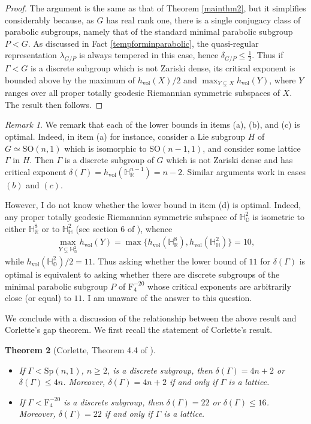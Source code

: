 \documentclass[psamsfonts]{amsart}
\newtheorem{thm}{Theorem}[section]
\theoremstyle{definition}
\theoremstyle{remark}
\newtheorem{rem}[thm]{Remark}
\numberwithin{equation}{section}
\begin{document}
\begin{proof}
The argument is the same as that of Theorem \ref{mainthm2}, but it simplifies considerably because, as $G$ has real rank one, there is a single conjugacy class of parabolic subgroups, namely that of the standard minimal parabolic subgroup $P < G$. As discussed in Fact \ref{tempforminparabolic}, the quasi-regular representation $\lambda_{G/P}$ is always tempered in this case, hence $\delta_{G/P} \leq \frac{1}{2}$. Thus if $\Gamma < G$ is a discrete subgroup which is not Zariski dense, its critical exponent is bounded above by the maximum of $h_{\mathrm{vol}}(X)/2$ and $\max_{Y \subsetneq X} h_{\mathrm{vol}}(Y)$, where $Y$ ranges over all proper totally geodesic Riemannian symmetric subspaces of $X$. The result then follows.
\end{proof}
\begin{rem}
We remark that each of the lower bounds in items (a), (b), and (c) is optimal. Indeed, in item (a) for instance, consider a Lie subgroup $H$ of $G \simeq \mathrm{SO}(n,1)$ which is isomorphic to SO$(n-1,1)$, and consider some lattice $\Gamma$ in $H$. Then $\Gamma$ is a discrete subgroup of $G$ which is not Zariski dense and has critical exponent $\delta(\Gamma) = h_{\mathrm{vol}}(\mathbb{H}_{\mathbb{R}}^{n-1}) = n-2$. Similar arguments work in cases $(b)$ and $(c)$.
\par 
However, I do not know whether the lower bound in item (d) is optimal. Indeed, any proper totally geodesic Riemannian symmetric subspace of $\mathbb{H}_{\mathbb{O}}^2$ is isometric to either $\mathbb{H}_{\mathbb{R}}^{8}$ or to $\mathbb{H}_{\mathbb{H}}^{2}$ (see section 6 of \cite{Cor}), whence 
\begin{align*}
\max_{Y \subsetneq \mathbb{H}_{\mathbb{O}}^{2}} h_{\mathrm{vol}}(Y) = \max \Big \{h_{\mathrm{vol}}(\mathbb{H}_{\mathbb{R}}^{8}), h_{\mathrm{vol}}(\mathbb{H}_{\mathbb{H}}^{2}) \Big \} = 10,
\end{align*} while $h_{\mathrm{vol}}(\mathbb{H}_{\mathbb{O}}^2)/2 = 11$. Thus asking whether the lower bound of $11$ for $\delta(\Gamma)$ is optimal is equivalent to asking whether there are discrete subgroups of the minimal parabolic subgroup $P$ of $\mathrm{F}_{4}^{-20}$ whose critical exponents are arbitrarily close (or equal) to $11$. I am unaware of the answer to this question.
\end{rem}
We conclude with a discussion of the relationship between the above result and Corlette's gap theorem. We first recall the statement of Corlette's result.
\begin{thm} [Corlette, Theorem 4.4 of \cite{Cor}]
\label{CorletteGapThm} ~\
\begin{itemize}
    \item[(1)] If $\Gamma < \mathrm{Sp}(n,1)$, $n \geq 2$, is a discrete subgroup, then $\delta(\Gamma) = 4n+2$ or $\delta(\Gamma) \leq 4n$. Moreover, $\delta(\Gamma) = 4n+2$ if and only if $\Gamma$ is a lattice.
    \item[(2)] If $\Gamma < \mathrm{F}_{4}^{-20}$ is a discrete subgroup, then $\delta(\Gamma) = 22$ or $\delta(\Gamma) \leq 16$. Moreover, $\delta(\Gamma) = 22$ if and only if $\Gamma$ is a lattice. 
\end{itemize}
\end{thm}
\end{document}
